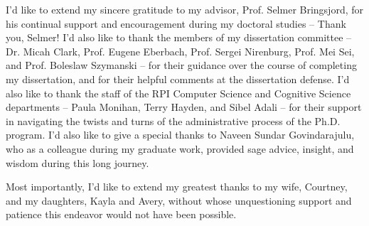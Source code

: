  

I'd like to extend my sincere gratitude to my advisor, Prof. Selmer Bringsjord, for his continual support and encouragement during my doctoral studies -- Thank you, Selmer!  I'd also like to thank the members of my dissertation committee -- Dr. Micah Clark, Prof. Eugene Eberbach, Prof. Sergei Nirenburg, Prof. Mei Sei, and Prof. Boleslaw Szymanski -- for their guidance over the course of completing my dissertation, and for their helpful comments at the dissertation defense.  I'd also like to thank the staff of the RPI Computer Science and Cognitive Science departments -- Paula Monihan, Terry Hayden, and Sibel Adali -- for their support in navigating the twists and turns of the administrative process of the Ph.D. program.  I'd also like to give a special thanks to Naveen Sundar Govindarajulu, who as a colleague during my graduate work, provided sage advice, insight, and wisdom during this long journey.  

Most importantly, I'd like to extend my greatest thanks to my wife, Courtney, and my daughters, Kayla and Avery, without whose unquestioning support and patience this endeavor would not have been possible.